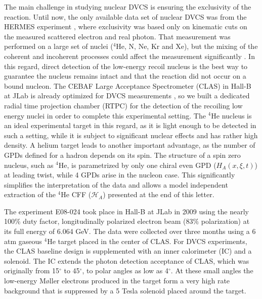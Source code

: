 \documentclass[preprint,nofootinbib,showpacs,prl,superscriptaddress,secnumarabic,amssymb,nobibnotes,aps,floatfix]{revtex4}
\begin{document}
The main challenge in studying nuclear DVCS is ensuring the exclusivity of 
the reaction. Until now, the only available data set of nuclear DVCS
was from the HERMES experiment \cite{Ellinghaus:2002zw}, where exclusivity was 
based only on kinematic cuts on the measured scattered electron and real photon. 
That measurement was performed on a large set of nuclei ($^4$He, N, Ne, Kr and 
Xe), but the mixing of the coherent and incoherent processes could affect the
measurement significantly \cite{Guzey:2003jh}. In this regard, direct 
detection of the low-energy 
recoil nucleus is the best way to guarantee the nucleus remains intact and that 
the reaction did not occur on a bound nucleon. The 
CEBAF Large Acceptance 
Spectrometer (CLAS) in Hall-B at JLab is already optimized for 
DVCS measurements 
\cite{Girod:2007aa,Gavalian:2009,Seder:2015,Pisano:2015,Jo:2015ema}, 
so we built a dedicated radial time projection chamber (RTPC) for the detection of 
the recoiling low energy nuclei in order to complete this experimental setting.  
The $^4$He nucleus is an ideal experimental target in this regard, as it is 
light enough to be detected in such a setting, while it
is subject to significant nuclear effects \cite{JSeely} and has rather high 
density.  A helium target leads to another important advantage, as the number of GPDs 
defined for a hadron depends on its spin. The structure of a spin zero nucleus, such as 
$^4$He, is parametrized by only one chiral even GPD ($H_{A}(x,\xi,t)$) at 
leading twist, while 4 GPDs arise in the nucleon case. This significantly
simplifies the interpretation of the data and allows a model independent
extraction of the $^4$He CFF ($\mathcal{H}_{A}$) presented at the
end of this letter. 


The experiment E08-024 took place in Hall-B at JLab
in 2009 using the nearly 100\% duty factor, longitudinally 
polarized electron beam (83$\%$ polarization) at its full energy of 6.064 
GeV. The data were collected over three months using a 6 atm gaseous $^4$He 
target placed in the center of CLAS. For DVCS experiments, the CLAS baseline 
design \cite{Mecking:2003zu} is supplemented with an inner calorimeter (IC) and 
a solenoid. The IC extends the photon detection acceptance of CLAS, which was 
originally from 15$^{\circ}$ to 45$^{\circ}$, to polar angles as low as 
4$^{\circ}$. At these small angles the low-energy M\o{}ller electrons produced 
in the target form a very high rate background that is
suppressed by a 5 Tesla solenoid placed around the target. 
\end{document}
